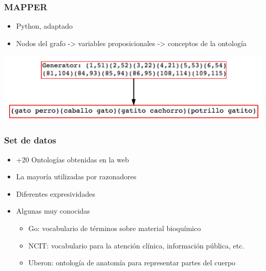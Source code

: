 \documentclass[compress,xcolor=dvipsnames]{beamer}
\theoremstyle{definition}
\begin{document}
\begin{frame}
	\frametitle{MAPPER}
	\begin{itemize}[<+->]
		\item Python, adaptado
		\item Nodos del grafo -> variables proposicionales -> conceptos de la ontología
	\end{itemize}
		\onslide<+->
	\begin{center}
    	\includegraphics[scale=0.5525]{gfx/mapper}
	\end{center}
\end{frame}

\begin{frame}
	\frametitle{Set de datos}
	\begin{itemize}[<+->]
		\item +20 Ontologías obtenidas en la web
		\item La mayoría utilizadas por razonadores
		\item Diferentes expresividades
		\item Algunas muy conocidas	
		\begin{itemize}[<+->]
			\item Go: vocabulario de términos sobre material bioquímico
			\item NCIT: vocabulario para la atención clínica, información pública, etc.
			\item Uberon: ontología de anatomía para representar partes del cuerpo
		\end{itemize}
	\end{itemize}
\end{frame}
\end{document}
